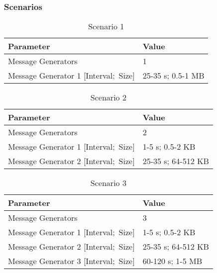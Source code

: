 \begin{frame}
  \frametitle{Scenarios}
	\begin{table}[!ht]
		\small
	    \begin{tabular}{ | p{} | p{} | }    
	    \hline
	    Parameter & Value \\ \hline \hline 
	    \hline
	    Message Generators & 1 \\ \hline
	    Message Generator 1 [Interval;~Size] & 25-35 s; 0.5-1 MB \\ \hline 
	    \hline
	    \end{tabular}
	    \caption{Scenario 1}
	\end{table}

	\begin{table}[!ht]
		\small
	    \begin{tabular}{ | p{} | p{} | }    
	    \hline
	    Parameter & Value \\ \hline \hline 
	    \hline
	    Message Generators & 2 \\ \hline
	    Message Generator 1 [Interval;~Size] & 1-5 s; 0.5-2 KB \\ \hline 
	    Message Generator 2 [Interval;~Size] & 25-35 s; 64-512 KB \\ \hline 
	    \hline
	    \end{tabular}
	    \caption{Scenario 2}
	\end{table}

	\begin{table}[!ht]
		\small	
	    \begin{tabular}{ | p{} | p{} | }    
	    \hline
	    Parameter & Value \\ \hline \hline 
	    \hline
	    Message Generators & 3 \\ \hline
	    Message Generator 1 [Interval;~Size] & 1-5 s; 0.5-2 KB \\ \hline 
	    Message Generator 2 [Interval;~Size] & 25-35 s; 64-512 KB \\ \hline 
	    Message Generator 3 [Interval;~Size] & 60-120 s; 1-5 MB \\ \hline 
	    \hline
	    \end{tabular}
	    \caption{Scenario 3}
	\end{table}
\end{frame}
